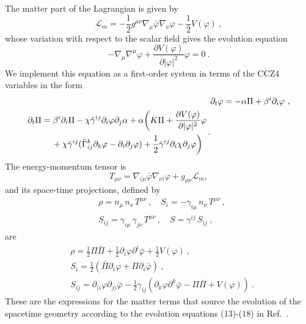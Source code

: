 \documentclass[aps,twocolumn,nofootinbib,superscriptaddress,amsfonts,floatfix
]{revtex4-1} %
\begin{document}
The matter part of the Lagrangian is given by
\begin{equation}
\mathcal{L}_m=-\frac{1}{2}g^{\mu\nu}\nabla_{\mu}{\bar{\varphi}}\nabla_{\nu}{\varphi}-\frac{1}{2} V(\varphi)~,
\end{equation}
whose variation with respect to the scalar field gives the evolution equation
\begin{equation}
-\nabla_\mu \nabla^\mu\varphi+\frac{\partial V(\varphi)}{\partial \vert{\varphi}\vert^2}\varphi=0~.
\end{equation}
We implement this equation as a first-order system in
terms of the CCZ4 variables in the form 
\begin{align}
&\partial_t \varphi = -\alpha \Pi +\beta^i\partial_i \varphi  ~ , \\
\begin{split} &\partial_t \Pi = \beta^i \partial_i \Pi - \chi \tilde{\gamma}^{ij}\partial_i \varphi \partial_j \alpha + \alpha\bigg( K\Pi + \frac{\partial V(\varphi)}{\partial \vert \varphi \vert^2}\varphi  \\
&\hspace{1.0cm} +  \chi\tilde{\gamma}^{ij}(\tilde{\Gamma}^k_{ij}\partial_k \varphi-\partial_i\partial_j \varphi)  + \frac{1}{2} \tilde{\gamma}^{ij}\partial_i \chi \partial_j \varphi\bigg) \end{split}\,.
\end{align}
The energy-momentum tensor is
\begin{equation}
T_{\mu\nu} =
\nabla_{(\mu}\bar{\varphi}\nabla_{\nu)}\varphi+g_{\mu\nu}\mathcal{L}_m,
\end{equation}
and its space-time projections, defined by
\begin{align} \label{eq:Mattersources}
&\rho = n_\mu \,n_\nu\,T^{\mu \nu}\,,\quad S_i = -\gamma_{i\mu }\,n_\nu\,T^{\mu \nu}\,, \nonumber \\
&S_{ij} = \gamma_{i\mu }\,\gamma_{j\nu}\,T^{\mu \nu}\,,\quad S = \gamma^{ij}\,S_{ij} ~,
\end{align}
are  
\begin{align} \label{eq:Mattereqns}
&\rho = \frac{1}{2}\Pi  \bar{\Pi} + \frac{1}{2} \partial_{i} \varphi \partial^{i} \bar{\varphi} +\frac{1}{2}V(\varphi)~, \\ 
&S_i  = \frac{1}{2}\left(\bar{\Pi} \partial_{i} \varphi + {\Pi} \partial_{i} \bar{\varphi} \right)  ~,
\label{eq:Si} \\
&S_{ij} = \partial_{(i} \varphi \partial_{j)} \bar{\varphi}  -  \frac{1}{2} \gamma_{ij}\left( \partial_{k} \varphi \partial^{k} \bar{\varphi}-\Pi  \bar{\Pi} + V(\varphi)\right) ~.
\end{align}
%
These are the expressions for the matter terms that source
the evolution of the spacetime geometry according to the
evolution equations (13)-(18) in Ref.~\cite{Radia:2021smk}.
\end{document}
